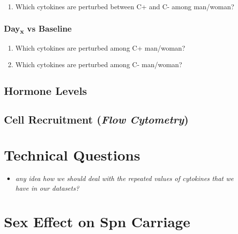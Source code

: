 \documentclass[
]{book}
\providecommand{\tightlist}{%
  \setlength{\itemsep}{0pt}\setlength{\parskip}{0pt}}
\begin{document}
\begin{enumerate}
\def\labelenumi{\arabic{enumi}.}
\tightlist
\item
  Which cytokines are perturbed between C+ and C- among man/woman?
\end{enumerate}

\hypertarget{dayx-vs-baseline-1}{%
\subsubsection{\texorpdfstring{Day\textsubscript{x} vs Baseline}{Dayx vs Baseline}}\label{dayx-vs-baseline-1}}

\begin{enumerate}
\def\labelenumi{\arabic{enumi}.}
\tightlist
\item
  Which cytokines are perturbed among C+ man/woman?
\item
  Which cytokines are perturbed among C- man/woman?
\end{enumerate}

\hypertarget{hormone-levels}{%
\subsection{Hormone Levels}\label{hormone-levels}}

\hypertarget{cell-recruitment-flow-cytometry}{%
\subsection{\texorpdfstring{Cell Recruitment (\emph{Flow Cytometry})}{Cell Recruitment (Flow Cytometry)}}\label{cell-recruitment-flow-cytometry}}

\hypertarget{technical-questions}{%
\section{Technical Questions}\label{technical-questions}}

\begin{itemize}
\tightlist
\item
  \emph{any idea how we should deal with the repeated values of cytokines that we have in our datasets?}
\end{itemize}

\hypertarget{sex-effect-on-spn-carriage}{%
\section{Sex Effect on Spn Carriage}\label{sex-effect-on-spn-carriage}}
\end{document}
